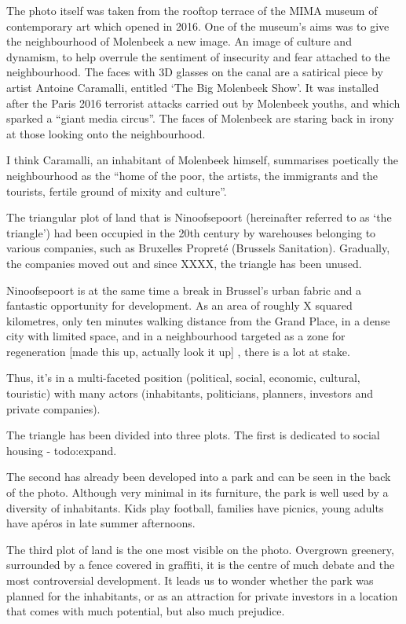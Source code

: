 \documentclass{article}[11pt]
\begin{document}
The photo itself was taken from the rooftop terrace of the MIMA museum of contemporary art which opened in 2016. One of the museum's aims was to give the neighbourhood of Molenbeek a new image. An image of culture and dynamism, to help overrule the sentiment of insecurity and fear attached to the neighbourhood. The faces with 3D glasses on the canal are a satirical piece by artist Antoine Caramalli, entitled `The Big Molenbeek Show'. It was installed after the Paris 2016 terrorist attacks carried out by Molenbeek youths, and which sparked a ``giant media circus''\parencite{antoine2016canal}. The faces of Molenbeek are staring back in irony at those looking onto the neighbourhood.

I think Caramalli, an inhabitant of Molenbeek himself, summarises poetically the neighbourhood as the ``home of the poor, the artists, the immigrants and the tourists, fertile ground of mixity and culture''\parencite{antoine2016canal}.

The triangular plot of land that is Ninoofsepoort (hereinafter referred to as `the triangle') had been occupied in the 20th century by warehouses belonging to various companies, such as Bruxelles Propreté (Brussels Sanitation). Gradually, the companies moved out and since XXXX, the triangle has been unused.

Ninoofsepoort is at the same time a break in Brussel's urban fabric and a fantastic opportunity for development. As an area of roughly X squared kilometres, only ten minutes walking distance from the Grand Place, in a dense city with limited space, and in a neighbourhood targeted as a zone for regeneration [made this up, actually look it up] \parencite{required}, there is a lot at stake.

Thus, it's in a multi-faceted position (political, social, economic, cultural, touristic) with many actors (inhabitants, politicians, planners, investors and private companies).


The triangle has been divided into three plots. 
The first is dedicated to social housing - todo:expand.

The second has already been developed into a park and can be seen in the back of the photo. Although very minimal in its furniture, the park is well used by a diversity of inhabitants. Kids play football, families have picnics, young adults have apéros in late summer afternoons.

The third plot of land is the one most visible on the photo. Overgrown greenery, surrounded by a fence covered in graffiti, it is the centre of much debate and the most controversial development. It leads us to wonder whether the park was planned for the inhabitants, or as an attraction for private investors in a location that comes with much potential, but also much prejudice.
\end{document}
